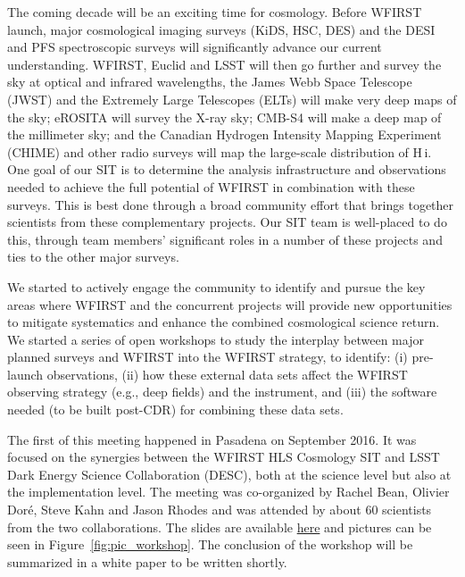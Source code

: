%
%
The coming decade will be an exciting time for cosmology. Before WFIRST launch,  major cosmological imaging surveys (KiDS, HSC, DES) and the DESI and PFS spectroscopic surveys will significantly advance our current understanding. WFIRST, Euclid and LSST  will then go further and survey the sky at optical and infrared wavelengths, the  James Webb Space Telescope (JWST) and the Extremely Large Telescopes (ELTs) will make very deep maps of the sky; eROSITA will survey the X-ray sky; CMB-S4 will make a deep map of the millimeter sky; and the Canadian Hydrogen Intensity Mapping Experiment (CHIME) and other radio surveys will map the large-scale distribution of H$\,${\sc i}.
%
%
One goal of our SIT is to determine the analysis infrastructure and observations needed to achieve the full potential of WFIRST in combination with these  surveys. This is best done through a broad community effort that brings together scientists from these complementary projects. Our SIT team is well-placed to do this, through team members' significant roles in a number of these projects and ties to the other major surveys.

We started to actively engage the community to identify and pursue the key areas where WFIRST and the concurrent projects will provide new opportunities to mitigate systematics and enhance the combined cosmological science return. We started a series of open workshops to study the interplay between major planned surveys and WFIRST into the WFIRST strategy, to identify: (i) pre-launch observations, (ii) how these external data sets affect the WFIRST observing strategy (e.g., deep fields) and the instrument, and (iii) the software needed (to be built post-CDR) for combining these data sets.

The first of this meeting happened in Pasadena on September 2016. It was focused on the synergies between the WFIRST HLS Cosmology SIT and LSST Dark Energy Science Collaboration (DESC), both at the science level but also at the implementation level. The meeting was co-organized by Rachel Bean, Olivier Dor\'e, Steve Kahn and Jason Rhodes and was attended by about 60 scientists from the two collaborations. The slides are available \href{https://conference.ipac.caltech.edu/wfirst_lsst/}{here} and pictures can be seen in Figure~\ref{fig:pic_workshop}. The conclusion of the workshop will be summarized in a white paper to be written shortly.

